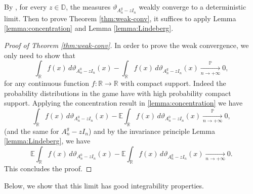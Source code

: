 \documentclass[11pt,oneside]{amsart}
\theoremstyle{plain}
\numberwithin{equation}{section}
\newcommand{\R}{\mathbb{R}}
\newcommand{\E}{\mathbb{E}}
\newcommand{\p}{\mathbb{P}}
\newcommand{\conv}{\xrightarrow[\textit{n} \to +\infty]{}}
\newcommand{\pconv}{\xrightarrow[\textit{n} \to +\infty]{\quad \p \quad}}
\begin{document}
By \cite{CookI}, for every $z\in \mathbb{D}$, the measures $\vartheta_{{A}_n^g-zI_n}$ weakly converge to a deterministic limit. Then to prove Theorem \ref{thm:weak-conv}, it suffices to apply Lemma \ref{lemma:concentration} and Lemma \ref{lemma:Lindeberg}. 

\begin{proof}[Proof of Theorem \ref{thm:weak-conv}]
    In order to prove the weak convergence, we only need to show that
    \begin{equation}
        \int_\mathbb{R} f(x) \, d\vartheta_{{A}_n^0-zI_n}(x) -       \int_\mathbb{R} f(x) \, d\vartheta_{{A}_n^g-zI_n}(x) \pconv 0,
    \end{equation}
    for any continuous function $f:\R\to \R$ with compact support.  Indeed the probability distributions in the game have with high probability compact support. Applying the concentration result in \ref{lemma:concentration} we have
    \begin{equation}
        \int_\mathbb{R} f(x) \, d\vartheta_{{A}_n^0-zI_n}(x)-\E\int_\mathbb{R} f(x) \, d\vartheta_{{A}_n^0-zI_n}(x) \pconv 0,
    \end{equation}
    (and the same for ${A}_n^g-zI_n$)
    and by the invariance principle Lemma \ref{lemma:Lindeberg}, we have 
        \begin{equation}
        \E\int_\mathbb{R} f(x) \, d\vartheta_{{A}_n^0-zI_n}(x)-\E\int_\mathbb{R} f(x) \, d\vartheta_{{A}_n^g-zI_n}(x) \conv 0.
    \end{equation}
    This concludes the proof.
\end{proof}

Below, we show that this limit has good integrability properties.
\end{document}
